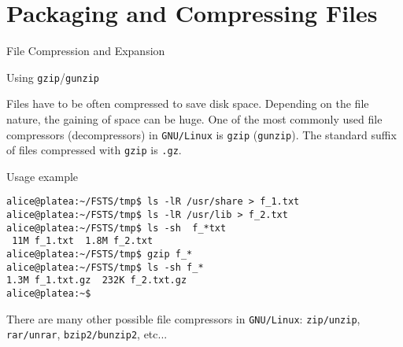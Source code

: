 \section{Packaging and Compressing Files}
\begin{frame}[t,fragile]{File Compression and Expansion}

  \vspace{-0.3cm}
  \begin{block}{Using \alert{\texttt{gzip}}/\alert{\texttt{gunzip}}}
    {\footnotesize Files have to be often compressed to save disk
  space. Depending on the file nature, the gaining of space can be
  huge. One of the most commonly used file compressors (decompressors)
  in \texttt{GNU/Linux} is \alert{\texttt{gzip}} (\alert{\texttt{gunzip}}). The standard suffix of files compressed with
  \texttt{gzip} is \alert{\texttt{.gz}}.

  Usage example  }



{\scriptsize
        \begin{lstlisting}
alice@platea:~/FSTS/tmp$ ls -lR /usr/share > f_1.txt
alice@platea:~/FSTS/tmp$ ls -lR /usr/lib > f_2.txt
alice@platea:~/FSTS/tmp$ ls -sh  f_*txt
 11M f_1.txt  1.8M f_2.txt
alice@platea:~/FSTS/tmp$ gzip f_*
alice@platea:~/FSTS/tmp$ ls -sh f_*
1.3M f_1.txt.gz  232K f_2.txt.gz
alice@platea:~$ 
        \end{lstlisting}


There are many other possible file compressors in
  \texttt{GNU/Linux}: \texttt{zip/unzip}, \texttt{rar/unrar},
  \texttt{bzip2/bunzip2}, etc...

}
  \end{block}
  
\end{frame}
